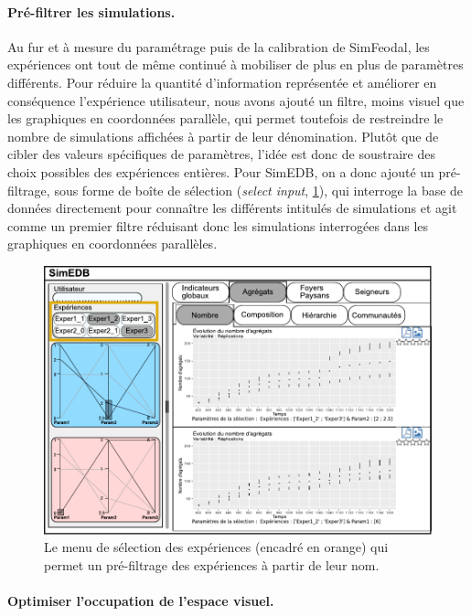\paragraph{Pré-filtrer les simulations.}

Au fur et à mesure du paramétrage puis de la calibration de SimFeodal, les expériences ont tout de même continué à mobiliser de plus en plus de paramètres différents.
Pour réduire la quantité d'information représentée et améliorer en conséquence \og l'expérience utilisateur\fg{}, nous avons ajouté un filtre, moins visuel que les graphiques en coordonnées parallèle, qui permet toutefois de restreindre le nombre de simulations affichées à partir de leur dénomination.
Plutôt que de cibler des valeurs spécifiques de paramètres, l'idée est donc de soustraire des choix possibles des expériences entières.
Pour SimEDB, on a donc ajouté un pré-filtrage, sous forme de \og boîte de sélection\fg{} (\textit{select input}, \cref{fig:simedb-prefilter}), qui interroge la base de données directement pour connaître les différents intitulés de simulations et agit comme un premier filtre réduisant donc les simulations interrogées dans les graphiques en coordonnées parallèles.

\begin{figure}[H]
	\centering
	\includegraphics[width=\linewidth]{img/mockup_SimEDB_selectinput.pdf}
	\caption[Le menu de sélection des expériences.]{Le menu de sélection des expériences (encadré en orange) qui permet un pré-filtrage des expériences à partir de leur nom.}
	\label{fig:simedb-prefilter}
\end{figure}

\paragraph{Optimiser l'occupation de l'espace visuel.}\label{par:simedb-resize-parcoords}

